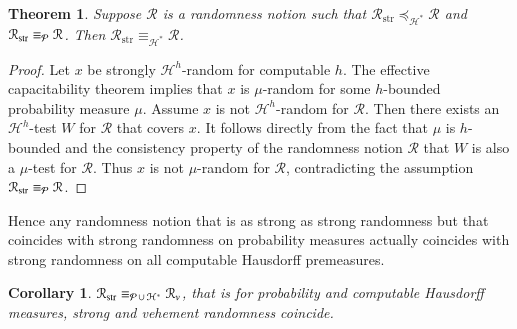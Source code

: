 \documentclass[11pt,reqno]{article}
\theoremstyle{plain}
\newtheorem{thm}{Theorem}
\newtheorem*{cor*}{Corollary}
\theoremstyle{definition}
\theoremstyle{remark}
\numberwithin{equation}{section}
\newcommand{\Hmeas}{\ensuremath{\mathcal{H}}}
\newcommand{\Hm}[1]{\ensuremath{\Hmeas^{#1}}}
\newcommand{\Pmeas}{\ensuremath{\CMcal{P}}}
\begin{document}
\begin{thm} \label{thm-equiv-strong-rand}
	Suppose $\mathcal{R}$ is a randomness notion such that $\mathcal{R}_{\operatorname{str}} \preceq_{\Hmeas^*} \mathcal{R}$ and $\mathcal{R}_{\operatorname{str}} \equiv_{\Pmeas} \mathcal{R}$. Then  $\mathcal{R}_{\operatorname{str}} \equiv_{\Hmeas^*} \mathcal{R}$.
\end{thm}
    
\begin{proof}
	Let $x$ be strongly $\Hm{h}$-random for computable $h$.  The effective capacitability theorem implies that $x$ is $\mu$-random for some $h$-bounded probability measure $\mu$. Assume $x$ is not $\Hm{h}$-random for $\mathcal{R}$. Then there exists an $\Hm{h}$-test $W$ for $\mathcal{R}$ that covers $x$. It follows directly from the fact that $\mu$ is $h$-bounded and the consistency property of the randomness notion $\mathcal{R}$ that $W$ is also a $\mu$-test for $\mathcal{R}$. Thus $x$ is not $\mu$-random for $\mathcal{R}$, contradicting the assumption $\mathcal{R}_{\operatorname{str}} \equiv_{\Pmeas} \mathcal{R}$.
 \end{proof}

Hence any randomness notion that is as strong as strong randomness but that coincides with strong randomness on probability measures actually coincides with strong randomness on all computable Hausdorff premeasures.

\begin{cor*} \label{cor-equiv-strong-veh}
	$\mathcal{R}_{\operatorname{str}} \equiv_{\Pmeas \, \cup\, \Hmeas^*} \mathcal{R}_{v}$, that is for probability and computable Hausdorff measures, strong and vehement randomness coincide.
\end{cor*}
\end{document}
